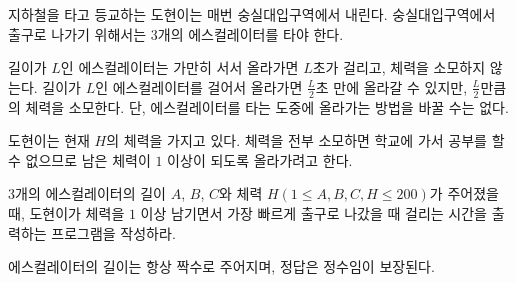 지하철을 타고 등교하는 도현이는 매번 숭실대입구역에서 내린다. 숭실대입구역에서 출구로 나가기 위해서는 3개의 에스컬레이터를 타야 한다.

길이가 $L$인 에스컬레이터는 가만히 서서 올라가면 $L$초가 걸리고, 체력을 소모하지 않는다. 길이가 $L$인 에스컬레이터를 걸어서 올라가면 $\frac{L}{2}$초 만에 올라갈 수 있지만, $\frac{L}{2}$만큼의 체력을 소모한다. 단, 에스컬레이터를 타는 도중에 올라가는 방법을 바꿀 수는 없다.

도현이는 현재 $H$의 체력을 가지고 있다. 체력을 전부 소모하면 학교에 가서 공부를 할 수 없으므로 남은 체력이 $1$ 이상이 되도록 올라가려고 한다.

3개의 에스컬레이터의 길이 $A$, $B$, $C$와 체력 $H$$(1 \le A, B, C, H \le 200)$가 주어졌을 때, 도현이가 체력을 $1$ 이상 남기면서 가장 빠르게 출구로 나갔을 때 걸리는 시간을 출력하는 프로그램을 작성하라.

에스컬레이터의 길이는 항상 짝수로 주어지며, 정답은 정수임이 보장된다.